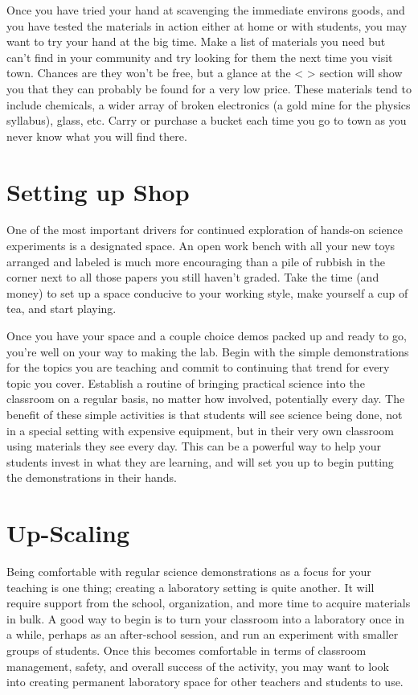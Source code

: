 Once you have tried your hand at scavenging the immediate environs goods, and you have tested the materials in action either at home or with students, you may want to try your hand at the big time.  Make a list of materials you need but can’t find in your community and try looking for them the next time you visit town.  Chances are they won’t be free, but a glance at the < > section will show you that they can probably be found for a very low price.  These materials tend to include chemicals, a wider array of broken electronics (a gold mine for the physics syllabus), glass, etc.  Carry or purchase a bucket each time you go to town as you never know what you will find there.

\section{Setting up Shop}
One of the most important drivers for continued exploration of hands-on science experiments is a designated space.  An open work bench with all your new toys arranged and labeled is much more encouraging than a pile of rubbish in the corner next to all those papers you still haven’t graded.  Take the time (and money) to set up a space conducive to your working style, make yourself a cup of tea, and start playing.

Once you have your space and a couple choice demos packed up and ready to go, you’re well on your way to making the lab.  Begin with the simple demonstrations for the topics you are teaching and commit to continuing that trend for every topic you cover.  Establish a routine of bringing practical science into the classroom on a regular basis, no matter how involved, potentially every day.  The benefit of these simple activities is that students will see science being done, not in a special setting with expensive equipment, but in their very own classroom using materials they see every day.  This can be a powerful way to help your students invest in what they are learning, and will set you up to begin putting the demonstrations in their hands.

\section{Up-Scaling}

Being comfortable with regular science demonstrations as a focus for your teaching is one thing; creating a laboratory setting is quite another.  It will require support from the school, organization, and more time to acquire materials in bulk.  A good way to begin is to turn your classroom into a laboratory once in a while, perhaps as an after-school session, and run an experiment with smaller groups of students.  Once this becomes comfortable in terms of classroom management, safety, and overall success of the activity, you may want to look into creating permanent laboratory space for other teachers and students to use.

